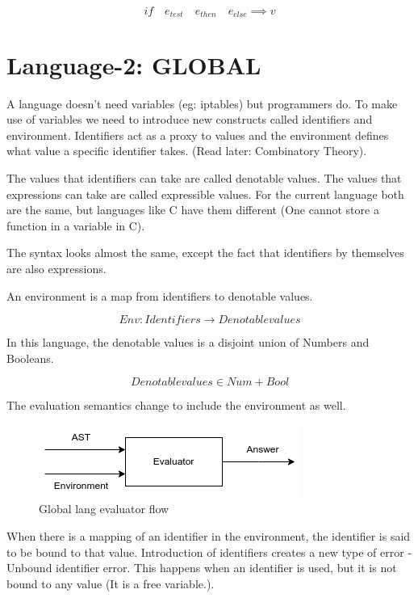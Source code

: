     \begin{displaymath}
        if \quad e_{test} \quad e_{then} \quad e_{else} \implies v
    \end{displaymath}

    \section{Language-2: GLOBAL}

    A language doesn't need variables (eg: iptables) but programmers do. To make use of variables we need to introduce new constructs called identifiers and environment. Identifiers act as a proxy to values and the environment defines what value a specific identifier takes. (Read later: Combinatory Theory).

    The values that identifiers can take are called denotable values. The values that expressions can take are called expressible values. For the current language both are the same, but languages like C have them different (One cannot store a function in a variable in C).

    The syntax looks almost the same, except the fact that identifiers by themselves are also expressions.

    An environment is a map from identifiers to denotable values.
    
    $$Env: Identifiers \rightarrow Denotable values$$

    In this language, the denotable values is a disjoint union of Numbers and Booleans.

    $$ Denotable values \in Num + Bool $$

    The evaluation semantics change to include the environment as well. 

    \begin{figure}[htbp]
        \center
        \includegraphics[scale=0.6]{images/lecture7/gloabal-eval.png}
        \caption{Global lang evaluator flow}
    \end{figure}

    When there is a mapping of an identifier in the environment, the identifier is said to be bound to that value. Introduction of identifiers creates a new type of error - Unbound identifier error. This happens when an identifier is used, but it is not bound to any value (It is a free variable.).

